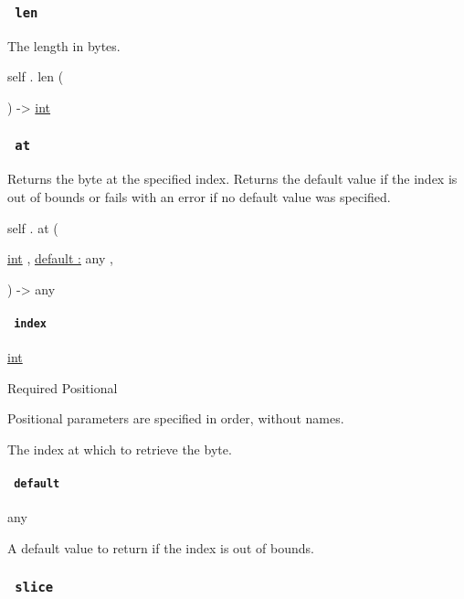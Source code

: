 \subsubsection{\texorpdfstring{\texttt{\ len\ }}{ len }}\label{definitions-len}

The length in bytes.

self { . } { len } (

) -\textgreater{} \href{/docs/reference/foundations/int/}{int}

\subsubsection{\texorpdfstring{\texttt{\ at\ }}{ at }}\label{definitions-at}

Returns the byte at the specified index. Returns the default value if
the index is out of bounds or fails with an error if no default value
was specified.

self { . } { at } (

{ \href{/docs/reference/foundations/int/}{int} , } {
\hyperref[definitions-at-parameters-default]{default :} { any } , }

) -\textgreater{} { any }

\paragraph{\texorpdfstring{\texttt{\ index\ }}{ index }}\label{definitions-at-index}

\href{/docs/reference/foundations/int/}{int}

{Required} {{ Positional }}

\label{definitions-at-index-positional-tooltip}
Positional parameters are specified in order, without names.

The index at which to retrieve the byte.

\paragraph{\texorpdfstring{\texttt{\ default\ }}{ default }}\label{definitions-at-default}

{ any }

A default value to return if the index is out of bounds.

\subsubsection{\texorpdfstring{\texttt{\ slice\ }}{ slice }}\label{definitions-slice}

